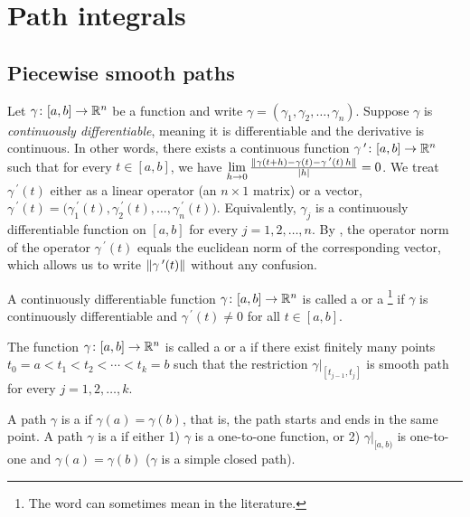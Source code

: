 
\sectionnewpage
\section{Path integrals}
\label{sec:pathintegral}


\subsection{Piecewise smooth paths}

Let $\gamma \colon [a,b] \to {\mathbb{R}}^n$ be a function and write
$\gamma = (\gamma_1,\gamma_2,\ldots,\gamma_n)$. 
Suppose $\gamma$ is 
\emph{continuously differentiable},
meaning
it is differentiable and the derivative is continuous.
In other words, there exists a continuous function $\gamma^{\:\prime} \colon [a,b]
\to {\mathbb{R}}^n$ such that for every $t \in [a,b]$, we have
$\lim\limits_{h \to 0}
\frac{\lVert {\gamma(t+h)-\gamma(t) - \gamma^{\:\prime}(t) \, h} \rVert}{\lvert {h} \rvert} = 0$.
We treat
$\gamma^{\:\prime}(t)$ either as a linear operator (an $n \times 1$ matrix) or
a vector,
$\gamma^{\:\prime}(t) =
\bigl( \gamma_1^{\:\prime}(t), \gamma_2^{\:\prime}(t), \ldots,
\gamma_n^{\:\prime}(t) \bigr)$.
Equivalently, 
$\gamma_j$ is a continuously differentiable function on $[a,b]$
for every $j=1,2,\ldots,n$.
By , the operator norm of
the operator $\gamma^{\:\prime}(t)$ equals
the euclidean norm of the corresponding vector, which allows us to write 
$\lVert {\gamma^{\:\prime}(t)} \rVert$ without any confusion.

\begin{defn}
A continuously differentiable function $\gamma \colon [a,b] \to {\mathbb{R}}^n$ is
called a \emph{}
or a
\emph{}\footnote{The
word  can sometimes mean
 in the literature.}
if
$\gamma$ is continuously differentiable and
$\gamma^{\:\prime}(t) \not= 0$ for all $t \in [a,b]$.

The function $\gamma \colon [a,b] \to {\mathbb{R}}^n$ is called a
\emph{} or a
\emph{}
if there exist finitely many points
$t_0 = a < t_1 < t_2 < \cdots < t_k = b$ such that
the restriction $\gamma|_{[t_{j-1},t_j]}$ is smooth path for every
$j=1,2,\ldots,k$.

A path $\gamma$ is 
a \emph{} if $\gamma(a) = \gamma(b)$, that is,
the path starts and ends in the same point.
A path $\gamma$ is a \emph{} if 
either 1) $\gamma$ is a one-to-one function, or 2)
$\gamma|_{[a,b)}$ is one-to-one and $\gamma(a)=\gamma(b)$ ($\gamma$ is a
simple closed path).
\end{defn}


